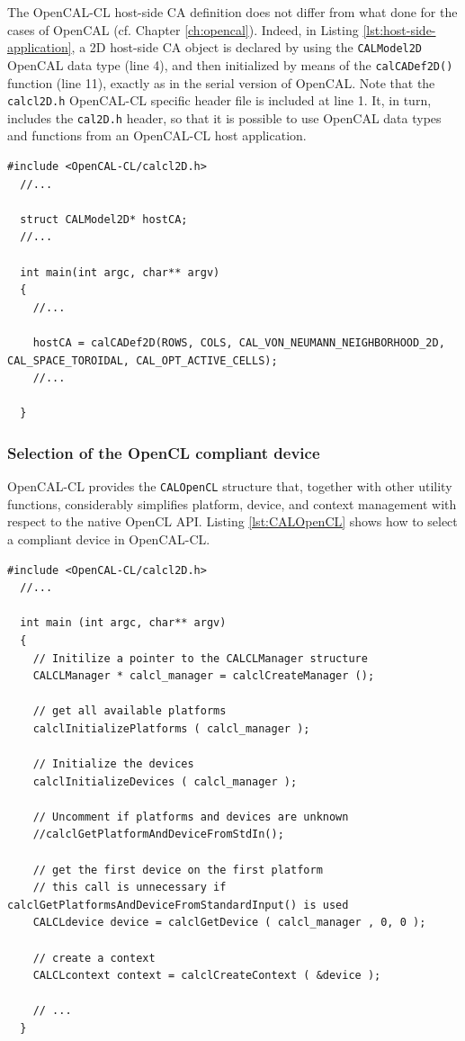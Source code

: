 The OpenCAL-CL host-side CA definition does not differ from what done
for the cases of OpenCAL (cf. Chapter \ref{ch:opencal}). Indeed, in
Listing \ref{lst:host-side-application}, a 2D host-side CA object is
declared by using the \verb'CALModel2D' OpenCAL data type (line 4),
and then initialized by means of the \verb'calCADef2D()' function
(line 11), exactly as in the serial version of OpenCAL. Note that the
\verb'calcl2D.h' OpenCAL-CL specific header file is included at line
1. It, in turn, includes the \verb'cal2D.h' header, so that it is
possible to use OpenCAL data types and functions from an OpenCAL-CL
host application.

\begin{lstlisting}[float,floatplacement=H, label=lst:host-side-application, caption={An example of OpenCAL-CL host-side application.}]
  #include <OpenCAL-CL/calcl2D.h>
  //...

  struct CALModel2D* hostCA;
  //...

  int main(int argc, char** argv)
  {
    //...

    hostCA = calCADef2D(ROWS, COLS, CAL_VON_NEUMANN_NEIGHBORHOOD_2D, CAL_SPACE_TOROIDAL, CAL_OPT_ACTIVE_CELLS);
    //...

  }
\end{lstlisting}


\subsubsection{Selection of the OpenCL compliant device}

OpenCAL-CL provides the \verb'CALOpenCL' structure that, together with
other utility functions, considerably simplifies platform, device, and
context management with respect to the native OpenCL API. Listing
\ref{lst:CALOpenCL} shows how to select a compliant device in
OpenCAL-CL.

\begin{lstlisting}[float,floatplacement=H, label=lst:CALOpenCL, caption=Access to platform and devices.]
  #include <OpenCAL-CL/calcl2D.h>
  //...

  int main (int argc, char** argv)
  {
    // Initilize a pointer to the CALCLManager structure
    CALCLManager * calcl_manager = calclCreateManager ();

    // get all available platforms
    calclInitializePlatforms ( calcl_manager );

    // Initialize the devices
    calclInitializeDevices ( calcl_manager );

    // Uncomment if platforms and devices are unknown
    //calclGetPlatformAndDeviceFromStdIn();

    // get the first device on the first platform
    // this call is unnecessary if calclGetPlatformsAndDeviceFromStandardInput() is used
    CALCLdevice device = calclGetDevice ( calcl_manager , 0, 0 );

    // create a context
    CALCLcontext context = calclCreateContext ( &device );

    // ...
  }
\end{lstlisting}

